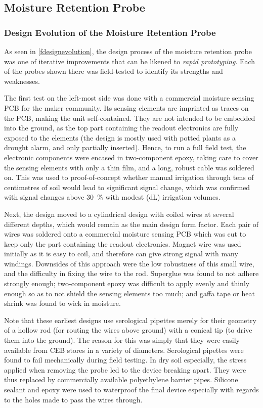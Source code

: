 \tocless \subsection{Moisture Retention Probe}
\subsubsection{Design Evolution of the Moisture Retention Probe}
\label{smrdesignevolution}
As seen in \cref{fdesignevolution}, the design process of the moisture retention probe was one of iterative improvements that can be likened to \emph{rapid prototyping}. Each of the probes shown there was field-tested to identify its strengths and weaknesses.

The first test on the left-most side was done with a commercial moisture sensing PCB for the maker community. Its sensing elements are imprinted as traces on the PCB, making the unit self-contained. They are not intended to be embedded into the ground, as the top part containing the readout electronics are fully exposed to the elements (the design is mostly used with potted plants as a drought alarm, and only partially inserted). Hence, to run a full field test, the electronic components were encased in two-component epoxy, taking care to cover the sensing elements with only a thin film, and a long, robust cable was soldered on. This was used to proof-of-concept whether manual irrigation through tens of centimetres of soil would lead to significant signal change, which was confirmed with signal changes above \SI{30}{\percent} with modest (dL) irrigation volumes.

Next, the design moved to a cylindrical design with coiled wires at several different depths, which would remain as the main design form factor. Each pair of wires was soldered onto a commercial moisture sensing PCB which was cut to keep only the part containing the readout electronics. Magnet wire was used initially as it is easy to coil, and therefore can give strong signal with many windings. Downsides of this approach were the low robustness of this small wire, and the difficulty in fixing the wire to the rod. Superglue was found to not adhere strongly enough; two-component epoxy was difficult to apply evenly and thinly enough so as to not shield the sensing elements too much; and gaffa tape or heat shrink was found to wick in moisture.

Note that these earliest designs use serological pipettes merely for their geometry of a hollow rod (for routing the wires above ground) with a conical tip (to drive them into the ground). The reason for this was simply that they were easily available from CEB stores in a variety of diameters. Serological pipettes were found to fail mechanically during field testing. In dry soil especially, the stress applied when removing the probe led to the device breaking apart.  They were thus replaced by commercially available polyethylene barrier pipes. Silicone sealant and epoxy were used to waterproof the final device especially with regards to the holes made to pass the wires through. 

